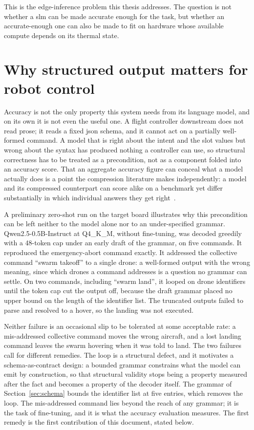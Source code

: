 This is the edge-inference problem this thesis addresses. The question is not whether a
\gls{slm} can be made accurate enough for the task, but whether an accurate-enough one can
also be made to fit on hardware whose available compute depends on its thermal state.

\section{Why structured output matters for robot control}
Accuracy is not the only property this system needs from its language model, and on its own it is
not even the useful one. A flight controller downstream does not read prose; it reads a fixed
\gls{json} schema, and it cannot act on a partially well-formed command. A model that is right
about the intent and the slot values but wrong about the syntax has produced nothing a controller
can use, so structural correctness has to be treated as a precondition, not as a component folded
into an accuracy score. That an aggregate accuracy figure can conceal what a model actually does is
a point the compression literature makes independently: a model and its compressed counterpart can
score alike on a benchmark yet differ substantially in which individual answers they get
right~\cite{dutta2024}.

A preliminary zero-shot run on the target board illustrates why this precondition can be left
neither to the model alone nor to an under-specified grammar. Qwen2.5-0.5B-Instruct at Q4\_K\_M,
without fine-tuning, was decoded greedily with a 48-token cap under an early draft of the grammar,
on five commands. It reproduced the emergency-abort command exactly. It addressed the collective
command ``swarm takeoff'' to a single drone: a well-formed output with the wrong meaning, since
which drones a command addresses is a question no grammar can settle. On two commands, including
``swarm land'', it looped on drone identifiers until the token cap cut the output off, because the
draft grammar placed no upper bound on the length of the identifier list. The truncated outputs
failed to parse and resolved to a hover, so the landing was not executed.

Neither failure is an occasional slip to be tolerated at some acceptable rate: a mis-addressed
collective command moves the wrong aircraft, and a lost landing command leaves the swarm hovering
when it was told to land. The two failures call for different remedies. The loop is a structural
defect, and it motivates a schema-as-contract design: a bounded grammar constrains what the model
can emit by construction, so that structural validity stops being a property measured after the
fact and becomes a property of the decoder itself. The grammar of Section~\ref{sec:schema} bounds
the identifier list at five entries, which removes the loop. The mis-addressed command lies beyond
the reach of any grammar; it is the task of fine-tuning, and it is what the accuracy evaluation
measures. The first remedy is the first contribution of this document, stated below.

